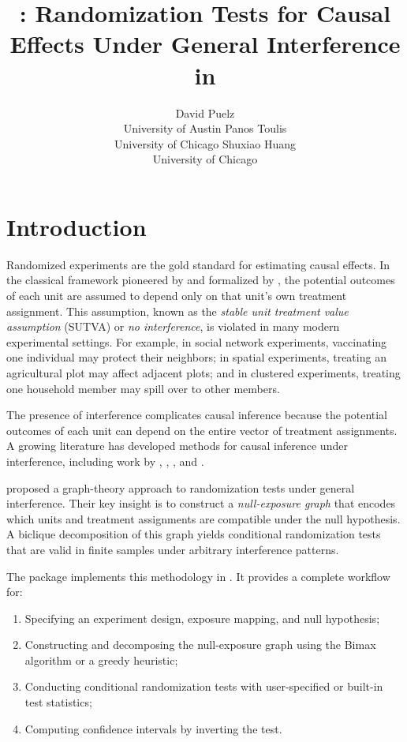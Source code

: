 \documentclass[article]{jss}
\author{David Puelz\\University of Austin \And
        Panos Toulis\\University of Chicago \And
        Shuxiao Huang\\University of Chicago}
\title{\pkg{BicliqueRT}: Randomization Tests for Causal Effects Under General Interference in \proglang{R}}
\begin{document}

\section{Introduction} \label{sec:intro}

Randomized experiments are the gold standard for estimating causal effects.
In the classical framework pioneered by \citet{fisher1935design} and
formalized by \citet{rubin1980randomization}, the potential outcomes of
each unit are assumed to depend only on that unit's own treatment
assignment.  This assumption, known as the \emph{stable unit treatment
value assumption} (SUTVA) or \emph{no interference}, is violated in many
modern experimental settings.  For example, in social network experiments,
vaccinating one individual may protect their neighbors; in spatial
experiments, treating an agricultural plot may affect adjacent plots; and
in clustered experiments, treating one household member may spill over to
other members.

The presence of interference complicates causal inference because the
potential outcomes of each unit can depend on the entire vector of treatment
assignments.  A growing literature has developed methods for causal
inference under interference, including work by
\citet{hudgens2008toward}, \citet{sobel2006randomized},
\citet{aronow2017estimating}, and \citet{basse2019randomization}.

\citet{puelz2022graph} proposed a graph-theory approach to
randomization tests under general interference.  Their key insight is to
construct a \emph{null-exposure graph} that encodes which units and
treatment assignments are compatible under the null hypothesis.  A
biclique decomposition of this graph yields conditional randomization
tests that are valid in finite samples under arbitrary interference
patterns.

The  package implements this methodology in 
\citep{R}.  It provides a complete workflow for:
\begin{enumerate}
  \item Specifying an experiment design, exposure mapping, and null
        hypothesis;
  \item Constructing and decomposing the null-exposure graph using the
        Bimax algorithm \citep{prelic2006systematic} or a greedy
        heuristic;
  \item Conducting conditional randomization tests with user-specified or
        built-in test statistics;
  \item Computing confidence intervals by inverting the test.
\end{enumerate}
\end{document}
